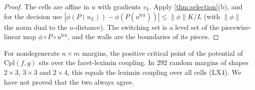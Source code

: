 \documentclass[11pt]{article}
\theoremstyle{definition}\newtheorem{definition}[theorem]{Definition}\newtheorem{remark}[theorem]{Remark}\newtheorem{example}[theorem]{Example}\newtheorem{problem}[theorem]{Open problem}\crefname{problem}{Problem}{Problems}
\begin{document}
\begin{proof}
The cells are affine in $u$ with gradients $v_k$. Apply \cref{thm:selection}(b), and for the decision use $|\phi(P(u_L))-\phi(P(u^{\mathrm{lex}}))|\le\|\phi\|K/L$ (with $\|\phi\|$ the norm dual to the $u$-distance). The switching set is a level set of the piecewise-linear map $\phi\circ P\circ u^{\mathrm{lex}}$, and the walls are the boundaries of its pieces.
\end{proof}

\begin{corollary}\label{cor:leximin}
For nondegenerate $n\times m$ margins, the positive critical point of the potential of $\mathrm{Cpl}(f,g)$ sits over the facet-leximin coupling. In $292$ random margins of shapes
$2\times3$, $3\times3$ and $2\times4$, this equals the leximin coupling over all cells (LX4). We have not proved that the two always agree.
\end{corollary}
\end{document}
